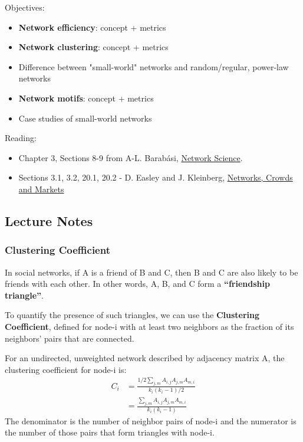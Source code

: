 \documentclass[11pt]{scrartcl} %
\begin{document}
Objectives:
\begin{itemize}
	\item \textbf{Network efficiency}: concept + metrics
	\item \textbf{Network clustering}: concept + metrics
	\item Difference between "small-world" networks and random/regular, power-law networks
	\item \textbf{Network motifs}: concept + metrics
	\item Case studies of small-world networks
\end{itemize}

Reading:
\begin{itemize}
	\item Chapter 3, Sections 8-9 from A-L. Barabási, \href{http://networksciencebook.com/}{Network Science}.
	\item Sections 3.1, 3.2, 20.1, 20.2 -  D. Easley and J. Kleinberg, \href{https://www.cs.cornell.edu/home/kleinber/networks-book/networks-book.pdf}{Networks, Crowds and Markets}
\end{itemize}

\subsection{Lecture Notes}

\subsubsection{Clustering Coefficient}
In social networks, if A is a friend of B and C, then B and C are also likely to be friends with each other. In other words, A, B, and C form a \textbf{“friendship triangle”}. 

To quantify the presence of such triangles, we can use the \textbf{Clustering Coefficient}, defined for node-i with at least two neighbors as the fraction of its neighbors' pairs that are connected.

For an undirected, unweighted network described by adjacency matrix A, the clustering coefficient for node-i is:
\begin{align*}
C_i &= \frac{1/2 \sum_{j,m} A_{i,j}A_{j,m}A_{m,i}}{k_i(k_i-1)/2} \\
	&= \frac{\sum_{j,m} A_{i,j}A_{j,m}A_{m,i}}{k_i(k_i-1)}
\end{align*}
The denominator is the number of neighbor pairs of node-i and the numerator is the number of those pairs that form triangles with node-i.
\end{document}
